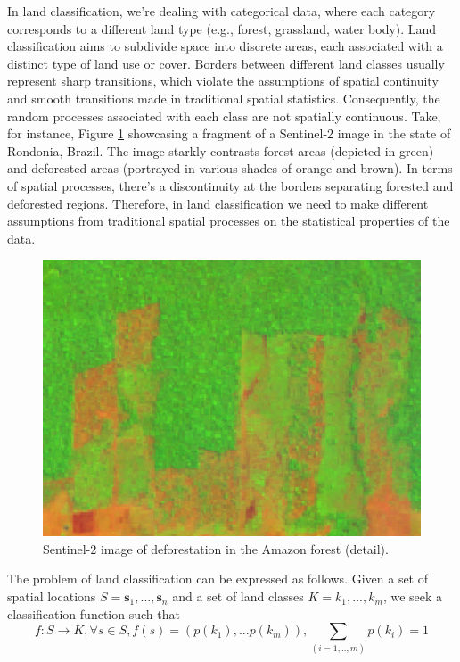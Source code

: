 \documentclass[
  shortnames]{jss}
\begin{document}
In land classification, we're dealing with categorical data, where each category corresponds to a different land type (e.g., forest, grassland, water body). Land classification aims to subdivide space into discrete areas, each associated with a distinct type of land use or cover. Borders between different land classes usually represent sharp transitions, which violate the assumptions of spatial continuity and smooth transitions made in traditional spatial statistics. Consequently, the random processes associated with each class are not spatially continuous. Take, for instance, Figure \ref{fig:roim} showcasing a fragment of a Sentinel-2 image in the state of Rondonia, Brazil. The image starkly contrasts forest areas (depicted in green) and deforested areas (portrayed in various shades of orange and brown). In terms of spatial processes, there's a discontinuity at the borders separating forested and deforested regions. Therefore, in land classification we need to make different assumptions from traditional spatial processes on the statistical properties of the data.

\begin{CodeChunk}
\begin{figure}[h]

{\centering \includegraphics[width=4.6in]{images/rondonia_image} 

}

\caption[Sentinel-2 image of deforestation in the Amazon forest (detail)]{Sentinel-2 image of deforestation in the Amazon forest (detail).}\label{fig:roim}
\end{figure}
\end{CodeChunk}

The problem of land classification can be expressed as follows. Given a set of spatial locations \(S = {\mathbf{s}_1, ..., \mathbf{s}_n}\) and a set of land classes \(K = {k_1, ..., k_m}\), we seek a classification function such that
\begin{equation}
f: S \to K, \forall s \in S, f(s) = (p(k_1), ...p(k_m)), \sum_{(i = 1,..,m)}p(k_i) = 1
\end{equation}
\end{document}
